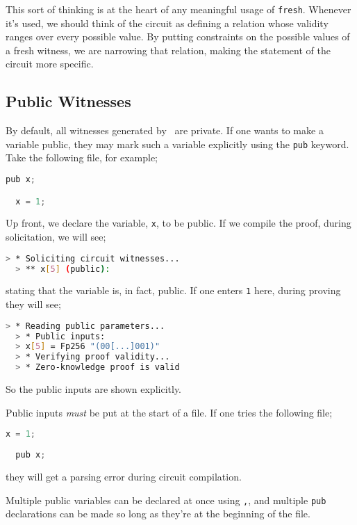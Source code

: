 This sort of thinking is at the heart of any meaningful usage of \lstinline{fresh}. Whenever it's used, we should think of the circuit as defining a relation whose validity ranges over every possible value. By putting constraints on the possible values of a fresh witness, we are narrowing that relation, making the statement of the circuit more specific.

\subsection{Public Witnesses}

By default, all witnesses generated by \vampir\ are private. If one wants to make a variable public, they may mark such a variable explicitly using the \lstinline|pub| keyword. Take the following file, for example;

\begin{lstlisting}[language=Python]
  pub x;

  x = 1;
\end{lstlisting}

Up front, we declare the variable, \lstinline|x|, to be public. If we compile the proof, during solicitation, we will see;

\begin{lstlisting}[language=bash]
  > * Soliciting circuit witnesses...
  > ** x[5] (public): 
\end{lstlisting}

stating that the variable is, in fact, public. If one enters \lstinline|1| here, during proving they will see;

\begin{lstlisting}[language=bash]
  > * Reading public parameters...
  > * Public inputs:
  > x[5] = Fp256 "(00[...]001)"
  > * Verifying proof validity...
  > * Zero-knowledge proof is valid
\end{lstlisting}

So the public inputs are shown explicitly.

Public inputs \textit{must} be put at the start of a file. If one tries the following file;

\begin{lstlisting}[language=Python]
  x = 1;
  
  pub x;
\end{lstlisting}

they will get a parsing error during circuit compilation.

Multiple public variables can be declared at once using \lstinline|,|, and multiple \lstinline|pub| declarations can be made so long as they're at the beginning of the file.

